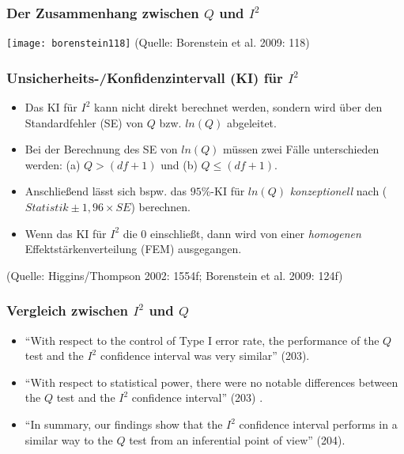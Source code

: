 \begin{frame}[shrink = 5]
  \frametitle{Der Zusammenhang zwischen $Q$ und  $I^2$}
  \texttt{[image: borenstein118]}
  \newline(Quelle: Borenstein et al. 2009: 118)
\end{frame}



\begin{frame}
  \frametitle{Unsicherheits-/Konfidenzintervall (KI) für $I^2$}
  \begin{itemize}
  \item Das KI für $I^2$ kann nicht direkt berechnet werden, sondern wird über den Standardfehler (SE) von $Q$ bzw. $ln(Q)$ abgeleitet.
  \item Bei der Berechnung des SE von $ln(Q)$ müssen zwei Fälle unterschieden werden: (a) $Q > (df+1)$ und (b) $Q \leq (df+1)$.
  \item Anschließend lässt sich bspw. das $95\%$-KI für $ln(Q)$ \emph{konzeptionell} nach ($Statistik \pm 1,96 \times SE$) berechnen.
  \item Wenn das KI für $I^2$ die 0 einschließt, dann wird von einer \emph{homogenen} Effektstärkenverteilung (FEM)
    ausgegangen.
  \end{itemize}
  (Quelle: Higgins/Thompson 2002: 1554f; Borenstein et al. 2009: 124f)
\end{frame}



\lstset{breaklines=true}


\begin{frame}
  \frametitle{Vergleich zwischen $I^2$ und $Q$}
  \begin{itemize}
  \item "`With respect to the control of Type I error rate, the performance of
    the $Q$ test and the $I^2$ confidence interval was very similar"' (203).
  \item "`With respect to statistical power, there were no notable differences
    between the $Q$ test and the $I^2$ confidence interval"' (203) .
  \item "`In summary, our findings show that the $I^2$ confidence interval
    performs in a similar way to the $Q$ test from an inferential point of
    view"' (204).
  \end{itemize}

\citep[Quelle: ][]{huedo-medina_assessing_2006}

\end{frame}



